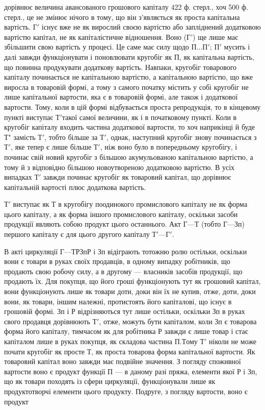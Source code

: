 \parcont{}  %
дорівнює величина авансованого грошового капіталу 422 ф. стерл., хоч
500 ф. стерл., це не змінює нічого в тому, що він з’являється як проста
капітальна вартість. $Г'$ існує вже не як вирослий своєю вартістю або
запліднений додатковою вартістю капітал, не як капіталістичне відношення.
Воно (Г') ще лише має збільшити свою вартість у процесі. Це саме має
силу щодо $П... П'$; $П'$ мусить і далі завжди функціонувати і поновлювати
кругобіг як П, як капітальна вартість, що повинна продукувати додаткову
вартість. Навпаки, кругобіг товарового капіталу починається не
капітальною вартістю, а капітальною вартістю, що вже виросла в товаровій
формі, а тому з самого початку містить у собі кругобіг не лише капітальної
вартости, яка є в товаровій формі, але також і додаткової вартости.
Тому, коли в цій формі відбувається проста репродукція, то в кінцевому
пункті виступає $Т' т$акої самої величини, як і в початковому пункті.
Коли в кругобіг капіталу входить частина додаткової вартости, то хоч
наприкінці й буде Т" замість $Т'$, тобто більше за $Т'$, однак, наступний кругобіг
знову починається з $Т'$, яке тепер є лише більше $Т'$, ніж воно
було в попередньому кругобігу, і починає свій новий кругобіг з більшою
акумульованою капітальною вартістю, а тому й з відповідно більшою
новоутвореною додатковою вартістю. В усіх випадках $Т'$ завжди починає
кругобіг як товаровий капітал, що дорівнює капітальній вартості плюс
додаткова вартість.

$Т'$ виступає як Т в кругобігу поодинокого промислового капіталу не
як форма цього капіталу, а як форма іншого промислового капіталу,
оскільки засоби продукції являють собою продукт цього останнього.
Акт $Г — Т$ (тобто $Г — Зп$) першого капіталу є для цього другого капіталу
$Т' — Г'$.

В акті циркуляції $Г — Т Р Зп Р$ і Зп відіграють тотожню ролю остільки,
оскільки вони є товари в руках своїх продавців, в одному випадку
робітників, що продають свою робочу силу, а в другому — власників
засобів продукції, що продають їх. Для покупця, що його гроші
функціонують тут як грошовий капітал, вони функціонують
лише як товари доти, доки він їх не купив, отже, доти, доки
вони, як товари, іншим належні, протистоять його капіталові, що
існує в грошовій формі. Зп і Р відрізняються тут лише остільки,
оскільки Зп в руках свого продавця дорівнюють $Т'$, отже, можуть бути
капіталом, коли Зп є товарова форма його капіталу, тимчасом як для
робітника Р завжди є лише товар і стає капіталом лише в руках покупця,
як складова частина $П.

Т$ому $Т'$ ніколи не може почати кругобіг як просте Т, як проста
товарова форма капітальної вартости. Як товаровий капітал воно завжди
має подвійне значення. З погляду споживної вартости воно є продукт
функції П — в даному разі пряжа, елементи якої Р і Зп, що як товари
походять із сфери циркуляції, функціонували лише як продуктотворчі
елементи цього продукту. Подруге, з погляду вартости, воно є продукт
\parbreak{}  %
